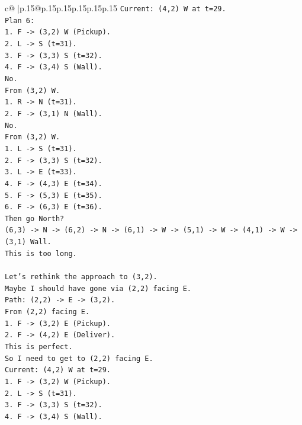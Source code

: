 \documentclass{article}
\begin{document}
{\begin{supertabular}{c@{$\;$}|p{.15\linewidth}@{}p{.15\linewidth}p{.15\linewidth}p{.15\linewidth}p{.15\linewidth}p{.15\linewidth}}
{{{\texttt{Current: (4,2) W at t=29.} \\
\texttt{Plan 6:} \\
\texttt{1. F {-}> (3,2) W (Pickup).} \\
\texttt{2. L {-}> S (t=31).} \\
\texttt{3. F {-}> (3,3) S (t=32).} \\
\texttt{4. F {-}> (3,4) S (Wall).} \\
\texttt{No.} \\
\texttt{From (3,2) W.} \\
\texttt{1. R {-}> N (t=31).} \\
\texttt{2. F {-}> (3,1) N (Wall).} \\
\texttt{No.} \\
\texttt{From (3,2) W.} \\
\texttt{1. L {-}> S (t=31).} \\
\texttt{2. F {-}> (3,3) S (t=32).} \\
\texttt{3. L {-}> E (t=33).} \\
\texttt{4. F {-}> (4,3) E (t=34).} \\
\texttt{5. F {-}> (5,3) E (t=35).} \\
\texttt{6. F {-}> (6,3) E (t=36).} \\
\texttt{Then go North?} \\
\texttt{(6,3) {-}> N {-}> (6,2) {-}> N {-}> (6,1) {-}> W {-}> (5,1) {-}> W {-}> (4,1) {-}> W {-}> (3,1) Wall.} \\
\texttt{This is too long.} \\
\\ 
\texttt{Let's rethink the approach to (3,2).} \\
\texttt{Maybe I should have gone via (2,2) facing E.} \\
\texttt{Path: (2,2) {-}> E {-}> (3,2).} \\
\texttt{From (2,2) facing E.} \\
\texttt{1. F {-}> (3,2) E (Pickup).} \\
\texttt{2. F {-}> (4,2) E (Deliver).} \\
\texttt{This is perfect.} \\
\texttt{So I need to get to (2,2) facing E.} \\
\texttt{Current: (4,2) W at t=29.} \\
\texttt{1. F {-}> (3,2) W (Pickup).} \\
\texttt{2. L {-}> S (t=31).} \\
\texttt{3. F {-}> (3,3) S (t=32).} \\
\texttt{4. F {-}> (3,4) S (Wall).} \\
}}}
\end{supertabular}}
\end{document}
